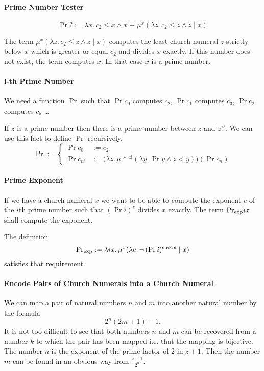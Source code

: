 \paragraph{Prime Number Tester}
$$\Pr? :=
\lambda x.\, c_2 \le x \land
x \equiv \mu^x (\lambda z.\, c_2 \le z \land z\mid x)$$

The term $\mu^x (\lambda z.\, c_2 \le z \land z\mid x)$ computes the least
church numeral $z$ strictly below $x$ which is greater or equal $c_2$ and
divides $x$ exactly. If this number does not exist, the term computes $x$. In
that case $x$ is a prime number.



\paragraph{i-th Prime Number} We need a function $\Pr$ such that $\Pr c_0$
computes $c_2$, $\Pr c_1$ computes $c_3$, $\Pr c_2$ computes $c_5$ \ldots

If $z$ is a prime number then there is a prime number between $z$ and
$z!'$. We can use this fact to define $\Pr$ recursively.
$$
\Pr :=
\begin{cases}
  \Pr c_0    &:= c_2 \\
  \Pr c_{n'} &:=
  \big(\lambda z.\,
  \mu^{\succ\ z!}(\lambda y.\, \Pr y \land z < y)\big)
  (\Pr c_n)
\end{cases}
$$



\paragraph{Prime Exponent} If we have a church numeral $x$ we want to be able
to compute the exponent $e$ of the $i$th prime number such that $(\Pr i)^e$
divides $x$ exactly. The term $\text{Pr}_{\text{exp}} i x$ shall compute the exponent.

The definition
$$ \text{Pr}_{\text{exp}} :=
 \lambda i x.\, \mu^x (\lambda e.\, \neg\,  (\Pr i)^{\text{succ}\, e} \mid x)
$$
satisfies that requirement.


\paragraph{Encode Pairs of Church Numerals into a Church Numeral}

We can map a pair of natural numbers $n$ and $m$ into another natural number
by the formula
$$ 2^n (2m+1) -1.$$
It is not too difficult to see that both numbers $n$ and $m$ can be recovered
from a number $k$ to which the pair has been mapped i.e. that the mapping is
bijective. The number $n$ is the exponent of the prime factor of $2$ in
$z+1$. Then the number $m$ can be found in an obvious way from
$\frac{z+1}{2^n}$.

